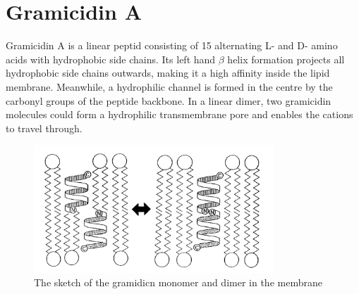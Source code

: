 \documentclass[a4paper,english,12pt,bibliography=totoc]{scrreprt}
\begin{document}
\section{Gramicidin A}
Gramicidin A is a linear peptid consisting of 15 alternating L- and D- amino acids with hydrophobic side chains. Its left hand $\beta$ helix formation projects all hydrophobic side chains outwards, making it a high affinity inside the lipid membrane. Meanwhile, a hydrophilic channel is formed in the centre by the carbonyl groups of the peptide backbone. In a linear dimer, two gramicidin molecules could form a hydrophilic transmembrane pore and enables the cations to travel through.
\begin{figure}[H]
\centering
\includegraphics[width = 0.8\textwidth]{Group 8/gramidicin dimer}
\caption{The sketch of the gramidicn monomer and dimer in the membrane}
\end{figure}
\end{document}
